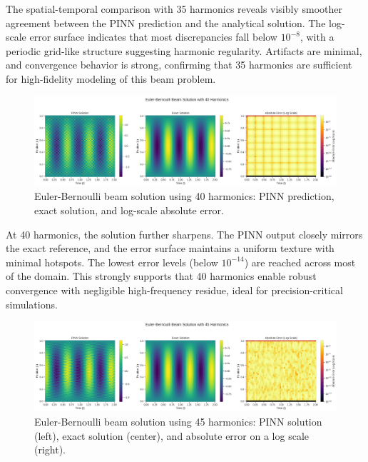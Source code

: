 \documentclass[preprint,12pt]{elsarticle}
\begin{document}
The spatial-temporal comparison with 35 harmonics reveals visibly smoother agreement between the PINN prediction and the analytical solution. The log-scale error surface indicates that most discrepancies fall below \(10^{-8}\), with a periodic grid-like structure suggesting harmonic regularity. Artifacts are minimal, and convergence behavior is strong, confirming that 35 harmonics are sufficient for high-fidelity modeling of this beam problem.

\begin{figure}[t]
    \centering
    \includegraphics[width=0.95\linewidth]{figures/comparison_40h.png}
    \caption{Euler-Bernoulli beam solution using 40 harmonics: PINN prediction, exact solution, and log-scale absolute error.}
    \label{fig:comparison_40h}
\end{figure}

At 40 harmonics, the solution further sharpens. The PINN output closely mirrors the exact reference, and the error surface maintains a uniform texture with minimal hotspots. The lowest error levels (below \(10^{-14}\)) are reached across most of the domain. This strongly supports that 40 harmonics enable robust convergence with negligible high-frequency residue, ideal for precision-critical simulations.

\begin{figure}[t]
    \centering
    \includegraphics[width=0.9\linewidth]{figures/comparison_45h.png}
    \caption{Euler-Bernoulli beam solution using 45 harmonics: PINN solution (left), exact solution (center), and absolute error on a log scale (right).}
    \label{fig:comparison_45h}
\end{figure}
\end{document}

